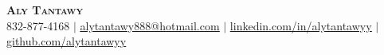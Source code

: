 \begin{center}
	\textbf{\Huge \scshape Aly Tantawy} \\ \vspace{1pt}
	\small 832-877-4168 $|$
    \href{mailto:alytantawy888@hotmail.com}{\underline{alytantawy888@hotmail.com}} $|$
	\href{https://www.linkedin.com/in/alytantawy/}{\underline{linkedin.com/in/alytantawyy}} $|$
	\href{https://github.com/alytantawyy}{\underline{github.com/alytantawyy}}
\end{center}
